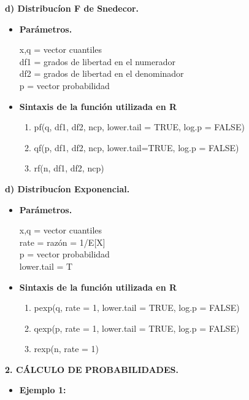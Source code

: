 \documentclass[12pt,letterpaper]{article}\usepackage[]{graphicx}\usepackage[]{color}
\begin{document}
\begin{description}
  \item \textbf{d) Distribuc\'ion F de Snedecor.}
\end{description}
\begin{itemize}
  \item \textbf{Par\'ametros.}
  \begin{center}
x,q = vector cuantiles\\ 
df1 = grados de libertad en el numerador\\ 
df2 = grados de libertad en el denominador\\ 
p = vector probabilidad\\
\end{center}
\item \textbf{Sintaxis de la funci\'on utilizada en R}
\begin{enumerate}
  \item pf(q, df1, df2, ncp, lower.tail = TRUE, log.p = FALSE)
  \item qf(p, df1, df2, ncp, lower.tail=TRUE, log.p = FALSE) 
  \item rf(n, df1, df2, ncp) 
\end{enumerate}
\end{itemize}

\begin{description}
  \item \textbf{d) Distribuc\'ion Exponencial.}
\end{description}
\begin{itemize}
  \item \textbf{Par\'ametros.}
  \begin{center}
x,q = vector cuantiles\\ 
rate = raz\'on = 1/E[X]\\
p = vector probabilidad \\
lower.tail = T \\
\end{center}
\item \textbf{Sintaxis de la funci\'on utilizada en R}
\begin{enumerate}
  \item pexp(q, rate = 1, lower.tail = TRUE, log.p = FALSE)
  \item qexp(p, rate = 1, lower.tail = TRUE, log.p = FALSE)
  \item rexp(n, rate = 1)  
\end{enumerate}
\end{itemize}

\begin{center}
\textbf{2.  C\'ALCULO DE PROBABILIDADES.}
\end{center}
\begin{itemize}
  \item \textbf{Ejemplo 1:}
\end{itemize}
\end{document}
